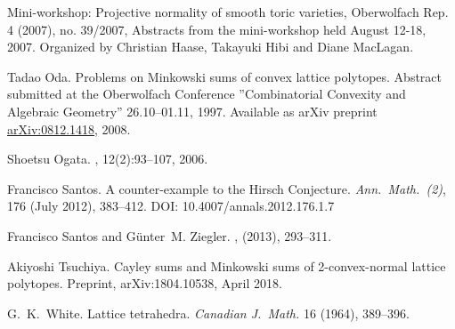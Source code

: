 \documentclass{amsart}
\theoremstyle{plain}
\theoremstyle{definition}
\begin{document}
\begin{thebibliography}{99}
Mini-workshop: Projective normality of smooth toric varieties, Oberwolfach Rep. 4 (2007), no. 39/2007, Abstracts from the mini-workshop held August 12-18, 2007. Organized by Christian Haase, Takayuki Hibi and Diane MacLagan.

Tadao Oda. Problems on Minkowski sums of convex lattice polytopes. 
Abstract submitted at the Oberwolfach Conference ''Combinatorial Convexity and Algebraic Geometry'' 26.10--01.11, 1997.
Available as arXiv preprint \href{https://arxiv.org/abs/0812.1418}{arXiv:0812.1418}, 2008.

Shoetsu Ogata.
, 12(2):93--107, 2006.

Francisco Santos.
A counter-example to the Hirsch Conjecture.
\emph{Ann.~Math.~(2)}, 176 (July 2012), 383--412. 
DOI: 10.4007/annals.2012.176.1.7

Francisco Santos and G{\"u}nter~M. Ziegler.
, 
 (2013), 293--311. %

Akiyoshi Tsuchiya.
Cayley sums and Minkowski sums of 2-convex-normal lattice polytopes.
Preprint, arXiv:1804.10538, April 2018.

G.~K.~White.
Lattice tetrahedra.
\emph{Canadian J.~Math.} 16 (1964), 389--396.

\end{thebibliography}
\end{document}
